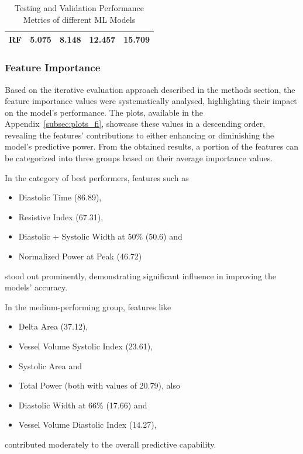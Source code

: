 \begin{table}[p]
\begin{minipage}{\textwidth}
\begin{tabular}{ |c|c|c|c|c| }
            \hline
            RF           & \cellcolor{green!30}5.075 & \cellcolor{green!30}8.148  & 12.457                     & 15.709                     \\
            \hline
        \end{tabular}
        \captionsetup{format=plain, justification=centering, font=small}
        \vspace{-0.2cm}
        \caption{Testing and Validation Performance Metrics of different ML Models}
        \label{tab:test_validate_rmse_mae}
    \end{minipage}
\end{table}

\newpage

\subsubsection{Feature Importance}
\label{subsubsec:feature_importance}

Based on the iterative evaluation approach described in the methods section, the feature importance values were systematically analysed, highlighting their impact on the model's performance.
The plots, available in the Appendix~\ref{subsec:plots_fi}, showcase these values in a descending order, revealing the features' contributions to either enhancing or diminishing the model's predictive power.
From the obtained results, a portion of the features can be categorized into three groups based on their average importance values.

In the category of best performers, features such as
\begin{itemize}[itemsep=2pt]
    \item Diastolic Time (86.89),
    \item Resistive Index (67.31),
    \item Diastolic + Systolic Width at 50\% (50.6) and
    \item Normalized Power at Peak (46.72)
\end{itemize}
stood out prominently, demonstrating significant influence in improving the models' accuracy.

In the medium-performing group, features like
\begin{itemize}[itemsep=2pt]
    \item Delta Area (37.12),
    \item Vessel Volume Systolic Index (23.61),
    \item Systolic Area and
    \item Total Power (both with values of 20.79), also
    \item Diastolic Width at 66\% (17.66) and
    \item Vessel Volume Diastolic Index (14.27),
\end{itemize}
contributed moderately to the overall predictive capability.

